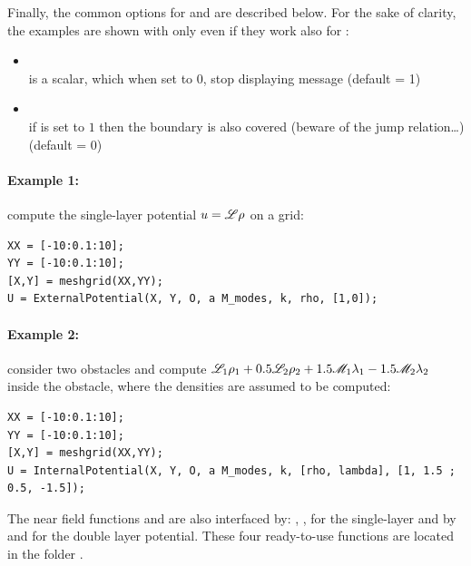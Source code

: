 Finally, the common options for  and  are described below. For the sake of clarity, the examples are shown with only  even if they work also for :
\begin{itemize}
\item {}\\
 is a scalar, which when set to 0, stop displaying message (default = 1)
\item {}\\
if  is set to $1$ then the boundary is also covered (beware of the jump relation\ldots) (default = 0)
\end{itemize}

\paragraph{Example 1: }compute the single-layer potential $u={\mathscr L}\rho$ on a grid:
\begin{lstlisting}
XX = [-10:0.1:10];
YY = [-10:0.1:10];
[X,Y] = meshgrid(XX,YY);
U = ExternalPotential(X, Y, O, a M_modes, k, rho, [1,0]);
\end{lstlisting}

\paragraph{Example 2: } consider two obstacles and compute ${\mathscr L}_1\rho_1 + 0.5{\mathscr L}_2\rho_2 + 1.5{\mathscr M}_1\lambda_1 -1.5{\mathscr M}_2\lambda_2$  inside the obstacle, where the densities are assumed to be computed:
\begin{lstlisting}
XX = [-10:0.1:10];
YY = [-10:0.1:10];
[X,Y] = meshgrid(XX,YY);
U = InternalPotential(X, Y, O, a M_modes, k, [rho, lambda], [1, 1.5 ; 0.5, -1.5]);
\end{lstlisting}

\begin{remark}
The near field functions  and  are also interfaced by: , , for the single-layer and by  and  for the double layer potential. These four ready-to-use functions are located in the folder .
\end{remark}

